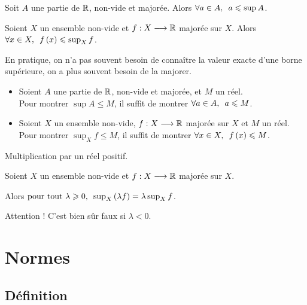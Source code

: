 \begin{prop}
Soit \(A\) une partie de \(\mathbb{R}\), non-vide et majorée. Alors \(\quantifs{\forall a\in A}a\leq\sup A\).

Soient \(X\) un ensemble non-vide et \(f:X\longrightarrow\mathbb{R}\) majorée sur \(X\). Alors \(\quantifs{\forall x\in X}f\paren{x}\leq\sup_Xf\).
\end{prop}

En pratique, on n'a pas souvent besoin de connaître la valeur exacte d'une borne supérieure, on a plus souvent besoin de la majorer.

\begin{prop}
\begin{itemize}
    \item Soient \(A\) une partie de \(\mathbb{R}\), non-vide et majorée, et \(M\) un réel. \\ Pour montrer \(\sup A\leq M\), il suffit de montrer \(\quantifs{\forall a\in A}a\leq M\). \\
    \item Soient \(X\) un ensemble non-vide, \(f:X\longrightarrow\mathbb{R}\) majorée sur \(X\) et \(M\) un réel. \\ Pour montrer \(\sup_Xf\leq M\), il suffit de montrer \(\quantifs{\forall x\in X}f\paren{x}\leq M\).
\end{itemize}
\end{prop}

Multiplication par un réel positif.

\begin{prop}
Soient \(X\) un ensemble non-vide et \(f:X\longrightarrow\mathbb{R}\) majorée sur \(X\).

Alors \(\quantifs{\tpt\lambda\geq0}\sup_X\paren{\lambda f}=\lambda\sup_Xf\).
\end{prop}

Attention ! C'est bien sûr faux si \(\lambda<0\).

\section{Normes}

\subsection{Définition}

